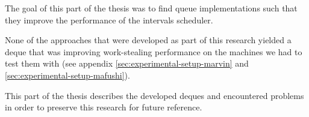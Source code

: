 The goal of this part of the thesis was to find queue implementations
such that they improve the performance of the intervals scheduler.

None of the approaches that were developed as part of this research
yielded a deque that was improving work-stealing performance on the
machines we had to test them with (see appendix
\ref{sec:experimental-setup-marvin} and
\ref{sec:experimental-setup-mafushi}).


This part of the thesis describes the developed deques and encountered
problems in order to preserve this research for future reference.


